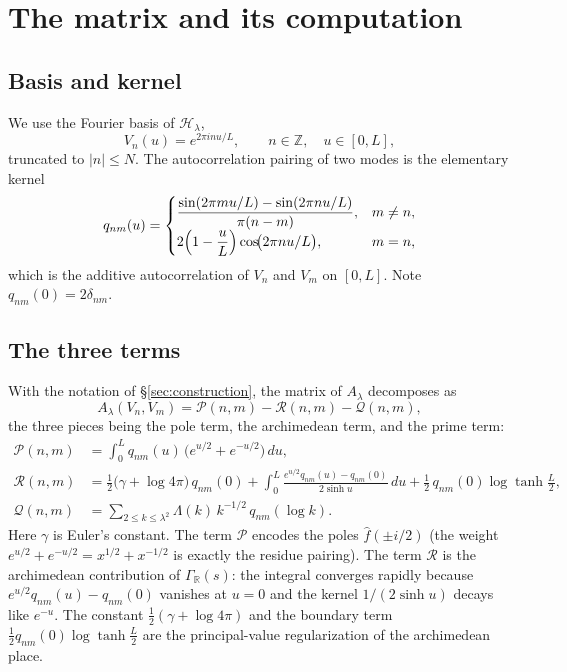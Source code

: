 \documentclass[11pt]{amsart}
\theoremstyle{definition}
\theoremstyle{remark}
\newcommand{\R}{\mathbb{R}}
\newcommand{\Z}{\mathbb{Z}}
\newcommand{\lam}{\lambda}
\begin{document}
\section{The matrix and its computation}\label{sec:matrix}

\subsection{Basis and kernel}
We use the Fourier basis of $\mathcal H_\lam$,
\[
V_n(u)=e^{2\pi i n u/L},\qquad n\in\Z,\quad u\in[0,L],
\]
truncated to $|n|\le N$. The autocorrelation pairing of two modes is the elementary kernel
\[
q_{nm}(u)=
\begin{cases}
\dfrac{\sin(2\pi m u/L)-\sin(2\pi n u/L)}{\pi(n-m)}, & m\ne n,\\[1.2ex]
2\Bigl(1-\dfrac{u}{L}\Bigr)\cos\!\bigl(2\pi n u/L\bigr), & m=n,
\end{cases}
\]
which is the additive autocorrelation of $V_n$ and $V_m$ on $[0,L]$. Note $q_{nm}(0)=2\delta_{nm}$.

\subsection{The three terms}
With the notation of \S\ref{sec:construction}, the matrix of $A_\lam$ decomposes as
\[
A_\lam(V_n,V_m)=\mathcal P(n,m)-\mathcal R(n,m)-\mathcal Q(n,m),
\]
the three pieces being the pole term, the archimedean term, and the prime term:
\begin{align}
\mathcal P(n,m)&=\int_0^L q_{nm}(u)\,\bigl(e^{u/2}+e^{-u/2}\bigr)\,du, \label{eq:P}\\[0.5ex]
\mathcal R(n,m)&=\tfrac12\bigl(\gamma+\log 4\pi\bigr)\,q_{nm}(0)
+\int_0^L \frac{e^{u/2}q_{nm}(u)-q_{nm}(0)}{2\sinh u}\,du
+\tfrac12\,q_{nm}(0)\log\tanh\tfrac{L}{2}, \label{eq:R}\\[0.5ex]
\mathcal Q(n,m)&=\sum_{2\le k\le \lam^2}\Lambda(k)\,k^{-1/2}\,q_{nm}(\log k). \label{eq:Q}
\end{align}
Here $\gamma$ is Euler's constant. The term $\mathcal P$ encodes the poles $\widehat f(\pm i/2)$ (the weight $e^{u/2}+e^{-u/2}=x^{1/2}+x^{-1/2}$ is exactly the residue pairing). The term $\mathcal R$ is the archimedean contribution of $\Gamma_\R(s)$: the integral converges rapidly because $e^{u/2}q_{nm}(u)-q_{nm}(0)$ vanishes at $u=0$ and the kernel $1/(2\sinh u)$ decays like $e^{-u}$. The constant $\tfrac12(\gamma+\log4\pi)$ and the boundary term $\tfrac12 q_{nm}(0)\log\tanh\tfrac L2$ are the principal-value regularization of the archimedean place.
\end{document}
